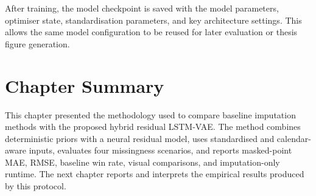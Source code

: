 After training, the model checkpoint is saved with the model parameters, optimiser state, standardisation parameters, and key architecture settings. This allows the same model configuration to be reused for later evaluation or thesis figure generation.

\section{Chapter Summary}
This chapter presented the methodology used to compare baseline imputation methods with the proposed hybrid residual LSTM-VAE. The method combines deterministic priors with a neural residual model, uses standardised and calendar-aware inputs, evaluates four missingness scenarios, and reports masked-point MAE, RMSE, baseline win rate, visual comparisons, and imputation-only runtime. The next chapter reports and interprets the empirical results produced by this protocol.
